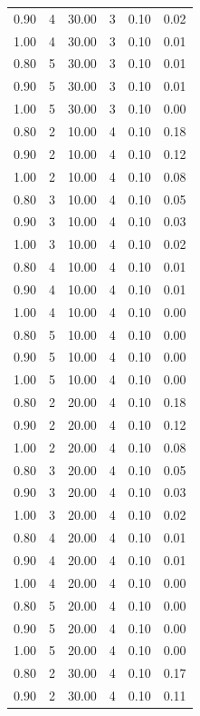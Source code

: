 \documentclass[12pt]{article}
\begin{document}
{{{{\begin{longtable}{cccccc}
  0.90 &   4 & 30.00 &   3 & 0.10 & 0.02 \\ 
  1.00 &   4 & 30.00 &   3 & 0.10 & 0.01 \\ 
  0.80 &   5 & 30.00 &   3 & 0.10 & 0.01 \\ 
  0.90 &   5 & 30.00 &   3 & 0.10 & 0.01 \\ 
  1.00 &   5 & 30.00 &   3 & 0.10 & 0.00 \\ 
  0.80 &   2 & 10.00 &   4 & 0.10 & 0.18 \\ 
  0.90 &   2 & 10.00 &   4 & 0.10 & 0.12 \\ 
  1.00 &   2 & 10.00 &   4 & 0.10 & 0.08 \\ 
  0.80 &   3 & 10.00 &   4 & 0.10 & 0.05 \\ 
  0.90 &   3 & 10.00 &   4 & 0.10 & 0.03 \\ 
  1.00 &   3 & 10.00 &   4 & 0.10 & 0.02 \\ 
  0.80 &   4 & 10.00 &   4 & 0.10 & 0.01 \\ 
  0.90 &   4 & 10.00 &   4 & 0.10 & 0.01 \\ 
  1.00 &   4 & 10.00 &   4 & 0.10 & 0.00 \\ 
  0.80 &   5 & 10.00 &   4 & 0.10 & 0.00 \\ 
  0.90 &   5 & 10.00 &   4 & 0.10 & 0.00 \\ 
  1.00 &   5 & 10.00 &   4 & 0.10 & 0.00 \\ 
  0.80 &   2 & 20.00 &   4 & 0.10 & 0.18 \\ 
  0.90 &   2 & 20.00 &   4 & 0.10 & 0.12 \\ 
  1.00 &   2 & 20.00 &   4 & 0.10 & 0.08 \\ 
  0.80 &   3 & 20.00 &   4 & 0.10 & 0.05 \\ 
  0.90 &   3 & 20.00 &   4 & 0.10 & 0.03 \\ 
  1.00 &   3 & 20.00 &   4 & 0.10 & 0.02 \\ 
  0.80 &   4 & 20.00 &   4 & 0.10 & 0.01 \\ 
  0.90 &   4 & 20.00 &   4 & 0.10 & 0.01 \\ 
  1.00 &   4 & 20.00 &   4 & 0.10 & 0.00 \\ 
  0.80 &   5 & 20.00 &   4 & 0.10 & 0.00 \\ 
  0.90 &   5 & 20.00 &   4 & 0.10 & 0.00 \\ 
  1.00 &   5 & 20.00 &   4 & 0.10 & 0.00 \\ 
  0.80 &   2 & 30.00 &   4 & 0.10 & 0.17 \\ 
  0.90 &   2 & 30.00 &   4 & 0.10 & 0.11 \\ 

\end{longtable}}}}}
\end{document}
